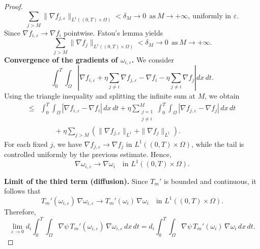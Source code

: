\documentclass[a4paper,12pt,reqno]{amsart}
\theoremstyle{plain}
\numberwithin{equation}{section}
\begin{document}
\begin{proof}
		\[
		\sum_{j>M}
		\|\nabla f_{j,\varepsilon}\|_{L^1((0,T)\times\Omega)}
		<\delta_M \to 0 \ \ \text{as}\ M\to+\infty,
		\ \text{uniformly in } \varepsilon.
		\]
		Since $\nabla f_{i,\varepsilon}\to \nabla f_{i}$ pointwise. Fatou's lemma yields
		\[
		\sum_{j>M}
		\|\nabla f_{j}\|_{L^1((0,T)\times\Omega)}
		<\delta_M \to 0 \ \ \text{as}\ M\to+\infty.
		\]
		\medskip
		\noindent\textbf{Convergence of the gradients of $\omega_{i,\varepsilon}$.}
		We consider
		\[
		\int_{0}^{T}\!\!\int_{\Omega}
		\left|
		\nabla f_{i,\varepsilon}
		+ \eta \sum_{j\ne i} \nabla f_{j,\varepsilon}
		-
		\nabla f_i
		-
		\eta \sum_{j\ne i} \nabla f_j
		\right| dx\,dt .
		\]
		Using the triangle inequality and splitting the infinite sum at $M$, we obtain
		\begin{align*}
			\le{}&
			\int_{0}^{T}\!\!\int_{\Omega}
			|\nabla f_{i,\varepsilon}-\nabla f_i|\,dx\,dt
			+
			\eta \sum_{\substack{j=1\\ j\ne i}}^{M}
			\int_{0}^{T}\!\!\int_{\Omega}
			|\nabla f_{j,\varepsilon}-\nabla f_j|\,dx\,dt
			\\
			&\qquad
			+
			\eta \sum_{j>M}
			\left(
			\|\nabla f_{j,\varepsilon}\|_{L^1}
			+
			\|\nabla f_j\|_{L^1}
			\right).
		\end{align*}
		For each fixed $j$, we have $\nabla f_{j,\varepsilon}\to\nabla f_j$ in
		$L^1((0,T)\times\Omega)$, while the tail is controlled uniformly by the
		previous estimate. Hence,
		\[
		\nabla\omega_{i,\varepsilon}
		\longrightarrow
		\nabla\omega_i
		\quad \text{in } L^1((0,T)\times\Omega).
		\]
		
		\medskip
		\noindent\textbf{Limit of the third term (diffusion).}
		Since $T_m'$ is bounded and continuous, it follows that
		\[
		T_m'(\omega_{i,\varepsilon})\,\nabla\omega_{i,\varepsilon}
		\longrightarrow
		T_m'(\omega_i)\,\nabla\omega_i
		\quad \text{in } L^1((0,T)\times\Omega).
		\]
		Therefore,
		\[
		\lim_{\varepsilon\to0}
		d_i \int_{0}^{T}\!\!\int_{\Omega}
		\nabla\psi\,
		T_m'(\omega_{i,\varepsilon})\,
		\nabla\omega_{i,\varepsilon}\,dx\,dt
		=
		d_i \int_{0}^{T}\!\!\int_{\Omega}
		\nabla\psi\,
		T_m'(\omega_i)\,
		\nabla\omega_i\,dx\,dt .
		\]
		

\end{proof}
\end{document}
